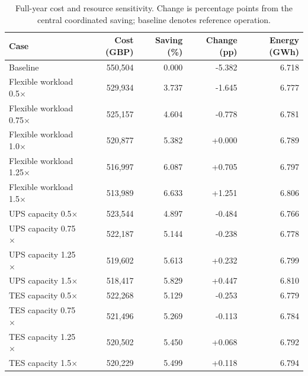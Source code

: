 \begin{table}[htbp]
\centering\small
\caption{Full-year cost and resource sensitivity. Change is percentage points from the central coordinated saving; baseline denotes reference operation.}\label{tab:annual-endpoints}
\begin{tabular}{@{}lrrrr@{}}\toprule
Case & Cost (GBP) & Saving (\%) & Change (pp) & Energy (GWh) \\\midrule
Baseline & 550,504 & 0.000 & -5.382 & 6.718 \\
Flexible workload 0.5$\times$ & 529,934 & 3.737 & -1.645 & 6.777 \\
Flexible workload 0.75$\times$ & 525,157 & 4.604 & -0.778 & 6.781 \\
Flexible workload 1.0$\times$ & 520,877 & 5.382 & +0.000 & 6.789 \\
Flexible workload 1.25$\times$ & 516,997 & 6.087 & +0.705 & 6.797 \\
Flexible workload 1.5$\times$ & 513,989 & 6.633 & +1.251 & 6.806 \\
UPS capacity 0.5$\times$ & 523,544 & 4.897 & -0.484 & 6.766 \\
UPS capacity 0.75$\times$ & 522,187 & 5.144 & -0.238 & 6.778 \\
UPS capacity 1.25$\times$ & 519,602 & 5.613 & +0.232 & 6.799 \\
UPS capacity 1.5$\times$ & 518,417 & 5.829 & +0.447 & 6.810 \\
TES capacity 0.5$\times$ & 522,268 & 5.129 & -0.253 & 6.779 \\
TES capacity 0.75$\times$ & 521,496 & 5.269 & -0.113 & 6.784 \\
TES capacity 1.25$\times$ & 520,502 & 5.450 & +0.068 & 6.792 \\
TES capacity 1.5$\times$ & 520,229 & 5.499 & +0.118 & 6.794 \\
\bottomrule\end{tabular}
\end{table}
